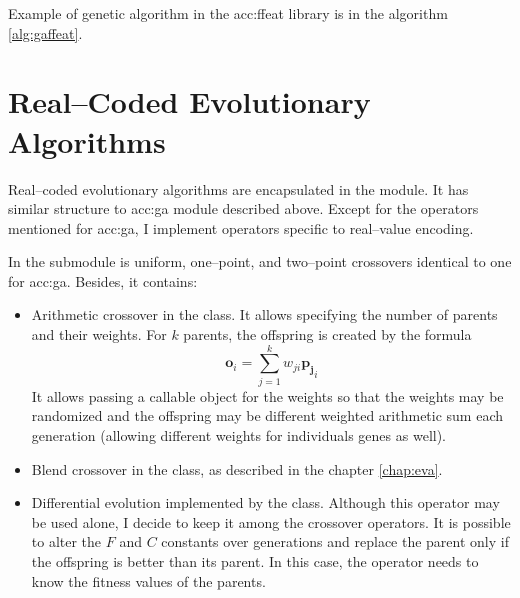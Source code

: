 Example of genetic algorithm in the \acrshort{acc:ffeat} library is in the algorithm \ref{alg:gaffeat}.





\section{Real--Coded Evolutionary Algorithms}

Real--coded evolutionary algorithms are encapsulated in the  module. It has similar structure to \acrshort{acc:ga} module described above. Except for the operators mentioned for \acrshort{acc:ga}, I implement operators specific to real--value encoding.

In the  submodule is uniform, one--point, and two--point crossovers identical to one for \acrshort{acc:ga}. Besides, it contains:
\begin{itemize}
    \item Arithmetic crossover in the  class. It allows specifying the number of parents and their weights. For $k$ parents, the offspring is created by the formula 
    $$\mathbf{o}_i=\sum_{j=1}^k w_{ji}\mathbf{p_j}_i$$
    It allows passing a callable object for the weights so that the weights may be randomized and the offspring may be different weighted arithmetic sum each generation (allowing different weights for individuals genes as well).
    \item Blend crossover in the  class, as described in the chapter \ref{chap:eva}.
    \item Differential evolution implemented by the  class. Although this operator may be used alone, I decide to keep it among the crossover operators. It is possible to alter the $F$ and $C$ constants over generations and replace the parent only if the offspring is better than its parent. In this case, the operator needs to know the fitness values of the parents.
\end{itemize}

